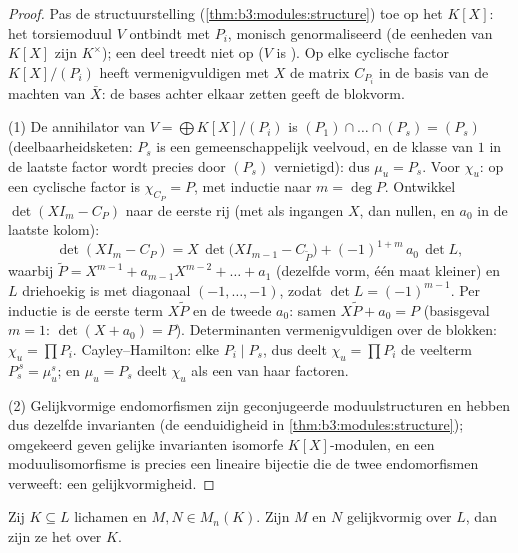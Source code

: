 \begin{proof}
Pas de structuurstelling (\cref{thm:b3:modules:structure}) toe op
het  $K[X]$: het torsiemoduul $V$ ontbindt met
 $P_i$, monisch genormaliseerd (de eenheden van
$K[X]$ zijn $K^\times$); een  deel treedt niet op ($V$ is
). Op elke cyclische factor $K[X]/(P_i)$ heeft
vermenigvuldigen met $X$ de matrix $C_{P_i}$ in de basis van de
machten van $\bar X$: de bases achter elkaar zetten geeft de
blokvorm.

(1) De annihilator van $V = \bigoplus K[X]/(P_i)$ is $(P_1)\cap
\dots\cap(P_s) = (P_s)$ (deelbaarheidsketen: $P_s$ is een
gemeenschappelijk veelvoud, en de klasse van $1$ in de laatste
factor wordt precies door $(P_s)$ vernietigd): dus $\mu_u = P_s$.
Voor $\chi_u$: op een cyclische factor is $\chi_{C_P} = P$, met
inductie naar $m = \deg P$. Ontwikkel $\det(XI_m - C_P)$ naar de
eerste rij (met als ingangen $X$, dan nullen, en $a_0$ in de
laatste kolom):
\[
\det(XI_m - C_P) = X\,\det\bigl(XI_{m-1} - C_{\tilde P}\bigr)
+ (-1)^{1+m}\,a_0\,\det L ,
\]
waarbij $\tilde P = X^{m-1} + a_{m-1}X^{m-2} + \dots + a_1$
(dezelfde vorm, één maat kleiner) en $L$ driehoekig is met
diagonaal $(-1, \dots, -1)$, zodat $\det L = (-1)^{m-1}$. Per
inductie is de eerste term $X\tilde P$ en de tweede $a_0$: samen
$X\tilde P + a_0 = P$ (basisgeval $m=1$: $\det(X + a_0) = P$).
Determinanten vermenigvuldigen over de blokken: $\chi_u = \prod
P_i$. Cayley--Hamilton: elke $P_i \mid P_s$, dus deelt $\chi_u =
\prod P_i$ de veelterm $P_s^{\,s} = \mu_u^s$; en $\mu_u = P_s$
deelt $\chi_u$ als een van haar factoren.

(2) Gelijkvormige endomorfismen zijn geconjugeerde
moduulstructuren en hebben dus dezelfde invarianten (de
eenduidigheid in \cref{thm:b3:modules:structure}); omgekeerd geven
gelijke invarianten isomorfe $K[X]$-modulen, en een
moduulisomorfisme is precies een lineaire bijectie die de twee
endomorfismen verweeft: een gelijkvormigheid.
\end{proof}

\begin{corollary}
\label{cor:b3:modules:descent}
Zij $K \subseteq L$ lichamen en $M, N \in M_n(K)$. Zijn $M$ en $N$
gelijkvormig over $L$, dan zijn ze het over $K$.
\end{corollary}

